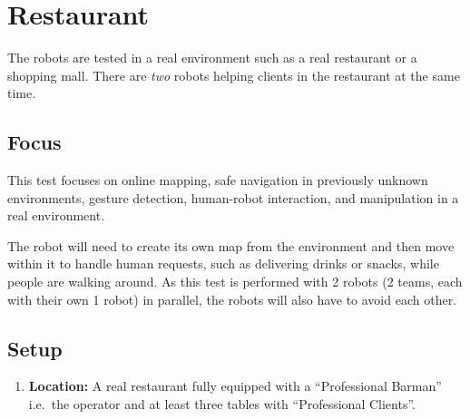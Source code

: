 \section{Restaurant}
The robots are tested in a real environment such as a real restaurant or a shopping mall.
There are \emph{two} robots helping clients in the restaurant at the same time.

\subsection{Focus}
This test focuses on online mapping, safe navigation in previously unknown environments, gesture detection, human-robot interaction, and manipulation in a real environment.

The robot will need to create its own map from the environment and then move within it to handle human requests, such as delivering drinks or snacks, while people are walking around.
As this test is performed with 2 robots (2 teams, each with their own 1 robot) in parallel, the robots will also have to avoid each other.

\subsection{Setup}
\begin{enumerate}
	\item \textbf{Location:} A real restaurant fully equipped with a \enquote{Professional Barman} i.e.~the operator and at least three tables with \enquote{Professional Clients}.
\end{enumerate}

